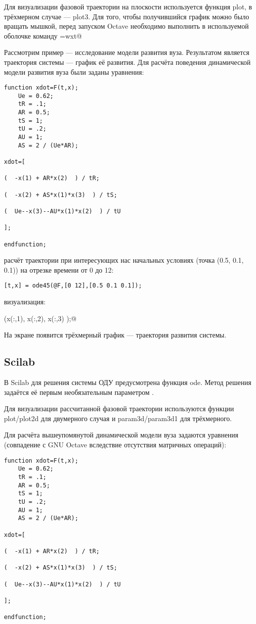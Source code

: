 \documentclass[10pt, a5paper]{article}
\begin{document}
Для визуализации фазовой траектории на плоскости используется функция plot, в трёхмерном случае — plot3. Для того, чтобы получившийся график можно было вращать мышкой, перед запуском Octave необходимо выполнить в используемой оболочке команду \verb@GNUTERM=wxt@

Рассмотрим пример --- исследование модели развития вуза. Результатом является траектория системы --- график её развития.
Для расчёта поведения динамической модели развития вуза \cite{2} были заданы уравнения:
\begin{verbatim}
function xdot=F(t,x);
    Ue = 0.62;
    tR = .1;
    AR = 0.5;
    tS = 1;
    tU = .2;
    AU = 1;
    AS = 2 / (Ue*AR);

xdot=[

(  -x(1) + AR*x(2)  ) / tR;

(  -x(2) + AS*x(1)*x(3)  ) / tS;

(  Ue--x(3)--AU*x(1)*x(2)  ) / tU

];

endfunction;
\end{verbatim}
расчёт траектории при интересующих нас начальных условиях (точка (0.5, 0.1, 0.1)) на отрезке времени от 0 до 12:

\verb![t,x] = ode45(@F,[0 12],[0.5 0.1 0.1]);!

визуализация:

(x(:,1), x(:,2), x(:,3) );@

На экране появится трёхмерный график — траектория развития системы.

\subsection*{Scilab}

В Scilab для решения системы ОДУ предусмотрена функция ode. Метод решения задаётся её первым необязательным параметром \cite{3}.

Для визуализации рассчитанной фазовой траектории используются функции plot/plot2d для двумерного случая и param3d/param3d1 для трёхмерного.

Для расчёта вышеупомянутой динамической модели вуза задаются уравнения (совпадение с GNU Octave вследствие отсутствия матричных операций):
\begin{verbatim}
function xdot=F(t,x);
    Ue = 0.62;
    tR = .1;
    AR = 0.5;
    tS = 1;
    tU = .2;
    AU = 1;
    AS = 2 / (Ue*AR);

xdot=[

(  -x(1) + AR*x(2)  ) / tR;

(  -x(2) + AS*x(1)*x(3)  ) / tS;

(  Ue--x(3)--AU*x(1)*x(2)  ) / tU

];

endfunction;
\end{verbatim}
\end{document}

